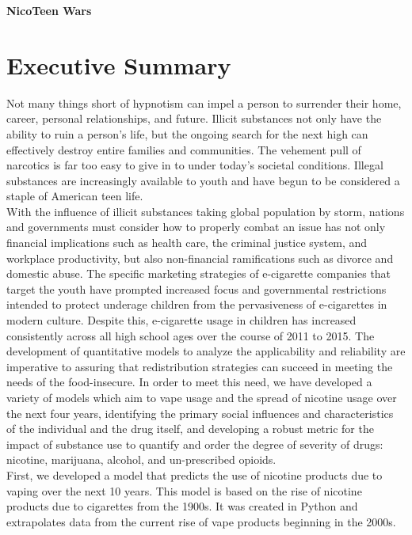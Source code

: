 \documentclass{article}
\begin{document}
{\center \textbf{\Huge{NicoTeen Wars}} \par}

\section{Executive Summary}
Not many things short of hypnotism can impel a person to surrender their home, career,  personal relationships, and future. Illicit substances not only have the ability to ruin a person’s life, but the ongoing search for the next high can effectively destroy entire families and communities. The vehement pull of narcotics is far too easy to give in to under today’s societal conditions. Illegal substances are increasingly available to youth and have begun to be considered a staple of American teen life.\\

With the influence of illicit substances taking global population by storm, nations and governments must consider how to properly combat an issue has not only financial implications such as health care, the criminal justice system, and workplace productivity, but also non-financial ramifications such as divorce and domestic abuse. The specific marketing strategies of e-cigarette companies that target the youth have prompted increased focus and governmental restrictions intended to protect underage children from the pervasiveness of e-cigarettes in modern culture. Despite this, e-cigarette usage in children has increased consistently across all high school ages over the course of 2011 to 2015. The development of quantitative models to analyze the applicability and reliability are imperative to assuring that redistribution strategies can succeed in meeting the needs of the food-insecure. In order to meet this need, we have developed a variety of models which aim to vape usage and the spread of nicotine usage over the next four years, identifying the primary social influences and characteristics of the individual and the drug itself, and developing a robust metric for the impact of substance use to quantify and order the degree of severity of drugs: nicotine, marijuana, alcohol, and un-prescribed opioids.\\

First, we developed a model that predicts the use of nicotine products due to vaping over the next 10 years. This model is based on the rise of nicotine products due to cigarettes from the 1900s. It was created in Python and extrapolates data from the current rise of vape products beginning in the 2000s. \\
\end{document}
